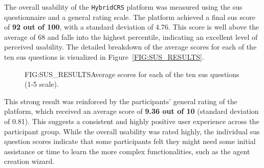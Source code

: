 The overall usability of the \texttt{HybridCRS} platform was measured using the \ac{sus} questionnaire and a general rating scale. The platform achieved a final \ac{sus} score of \textbf{92 out of 100}, with a standard deviation of 4.76. This score is well above the average of 68 and falls into the highest percentile, indicating an excellent level of perceived usability. The detailed breakdown of the average scores for each of the ten \acs{sus} questions is visualized in Figure~\ref{FIG:SUS_RESULTS}.

\begin{figure}[SUS Question Scores]{FIG:SUS_RESULTS}{Average scores for each of the ten \acs{sus} questions (1-5 scale).}
    
\end{figure}

This strong result was reinforced by the participants' general rating of the platform, which received an average score of \textbf{9.36 out of 10} (standard deviation of 0.81). This suggests a consistent and highly positive user experience across the participant group. While the overall usability was rated highly, the individual \acs{sus} question scores indicate that some participants felt they might need some initial assistance or time to learn the more complex functionalities, such as the agent creation wizard.